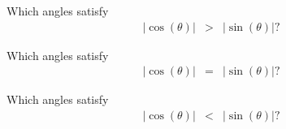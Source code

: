 \begin{problem}
\begin{subproblem}
  \item Which angles satisfy
    \begin{eqnarray*}
      |\cos(\theta)| & > & |\sin(\theta) |?
    \end{eqnarray*}
    \vfill
  \item Which angles satisfy
    \begin{eqnarray*}
      |\cos(\theta)| & = & |\sin(\theta) |?
    \end{eqnarray*}
    \vfill
  \item Which angles satisfy
    \begin{eqnarray*}
      |\cos(\theta)| & < & |\sin(\theta) |?
    \end{eqnarray*}
    \vfill
  \end{subproblem}


\end{problem}


